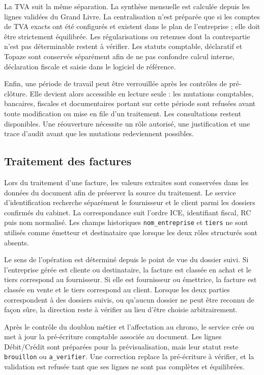 \documentclass[12pt,a4paper,oneside]{report}
\begin{document}
La TVA suit la même séparation. La synthèse mensuelle est calculée depuis les
lignes validées du Grand Livre. La centralisation n'est préparée que si les
comptes de TVA exacts ont été configurés et existent dans le plan de
l'entreprise ; elle doit être strictement équilibrée. Les régularisations ou
retenues dont la contrepartie n'est pas déterminable restent à vérifier. Les
statuts comptable, déclaratif et Topaze sont conservés séparément afin de ne
pas confondre calcul interne, déclaration fiscale et saisie dans le logiciel de
référence.

Enfin, une période de travail peut être verrouillée après les contrôles de
pré-clôture. Elle devient alors accessible en lecture seule : les mutations
comptables, bancaires, fiscales et documentaires portant sur cette période sont
refusées avant toute modification ou mise en file d'un traitement. Les
consultations restent disponibles. Une réouverture nécessite un rôle autorisé,
une justification et une trace d'audit avant que les mutations redeviennent
possibles.

\subsection{Traitement des factures}

Lors du traitement d'une facture, les valeurs extraites sont conservées dans
les données du document afin de préserver la source du traitement. Le service
d'identification recherche séparément le fournisseur et le client parmi les
dossiers confirmés du cabinet. La correspondance suit l'ordre ICE, identifiant
fiscal, RC puis nom normalisé. Les champs historiques
\texttt{nom\_entreprise} et \texttt{tiers} ne sont utilisés comme émetteur et
destinataire que lorsque les deux rôles structurés sont absents.

Le sens de l'opération est déterminé depuis le point de vue du dossier suivi.
Si l'entreprise gérée est cliente ou destinataire, la facture est classée en
achat et le tiers correspond au fournisseur. Si elle est fournisseur ou
émettrice, la facture est classée en vente et le tiers correspond au client.
Lorsque les deux parties correspondent à des dossiers suivis, ou qu'aucun
dossier ne peut être reconnu de façon sûre, la direction reste à vérifier au
lieu d'être choisie arbitrairement.

Après le contrôle du doublon métier et l'affectation au chrono, le service crée
ou met à jour la pré-écriture comptable associée au document. Les lignes
Débit/Crédit sont préparées pour la prévisualisation, mais leur statut reste
\texttt{brouillon} ou \texttt{a\_verifier}. Une correction replace la
pré-écriture à vérifier, et la validation est refusée tant que ses lignes ne
sont pas complètes et équilibrées.
\end{document}
